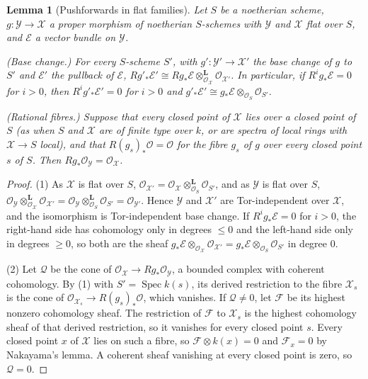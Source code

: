 \documentclass[11pt]{amsart}
\numberwithin{table}{section}
\numberwithin{figure}{section}
\numberwithin{equation}{section}
\newtheorem{lem}[thm]{Lemma}
\theoremstyle{definition}
\theoremstyle{plain}
\newcommand{\cO}{\mathcal{O}}
\newcommand{\cX}{\mathcal{X}}
\newcommand{\cY}{\mathcal{Y}}
\DeclareMathOperator{\Spec}{Spec}
\begin{document}
\begin{lem}[Pushforwards in flat families]\label{lem:flatfamilies}
Let $S$ be a noetherian scheme, $g\colon \cY \to \cX$ a proper morphism of noetherian $S$-schemes with $\cY$ and $\cX$ flat over $S$, and $\mathcal E$ a vector bundle on $\cY$.
\begin{thmlist}
\item (Base change.) For every $S$-scheme $S'$, with $g'\colon \cY' \to \cX'$ the base change of $g$ to $S'$ and $\mathcal E'$ the pullback of $\mathcal E$, $Rg'_*\mathcal E' \cong Rg_*\mathcal E \otimes^{\mathbf L}_{\cO_{\cX}} \cO_{\cX'}$. In particular, if $R^ig_*\mathcal E = 0$ for $i > 0$, then $R^ig'_*\mathcal E' = 0$ for $i > 0$ and $g'_*\mathcal E' \cong g_*\mathcal E \otimes_{\cO_S} \cO_{S'}$.
\item (Rational fibres.) Suppose that every closed point of $\cX$ lies over a closed point of $S$ (as when $S$ and $\cX$ are of finite type over $k$, or are spectra of local rings with $\cX \to S$ local), and that $R(g_s)_*\cO = \cO$ for the fibre $g_s$ of $g$ over every closed point $s$ of $S$. Then $Rg_*\cO_{\cY} = \cO_{\cX}$.
\end{thmlist}
\end{lem}

\begin{proof}
(1) As $\cX$ is flat over $S$, $\cO_{\cX'} = \cO_{\cX} \otimes^{\mathbf L}_{\cO_S} \cO_{S'}$, and as $\cY$ is flat over $S$, $\cO_{\cY} \otimes^{\mathbf L}_{\cO_{\cX}} \cO_{\cX'} = \cO_{\cY} \otimes^{\mathbf L}_{\cO_S} \cO_{S'} = \cO_{\cY'}$. Hence $\cY$ and $\cX'$ are Tor-independent over $\cX$, and the isomorphism is Tor-independent base change. If $R^ig_*\mathcal E = 0$ for $i > 0$, the right-hand side has cohomology only in degrees $\le 0$ and the left-hand side only in degrees $\ge 0$, so both are the sheaf $g_*\mathcal E \otimes_{\cO_{\cX}} \cO_{\cX'} = g_*\mathcal E \otimes_{\cO_S} \cO_{S'}$ in degree $0$.

(2) Let $\mathcal Q$ be the cone of $\cO_{\cX} \to Rg_*\cO_{\cY}$, a bounded complex with coherent cohomology. By (1) with $S' = \Spec k(s)$, its derived restriction to the fibre $\cX_s$ is the cone of $\cO_{\cX_s} \to R(g_s)_*\cO$, which vanishes. If $\mathcal Q \neq 0$, let $\mathcal F$ be its highest nonzero cohomology sheaf. The restriction of $\mathcal F$ to $\cX_s$ is the highest cohomology sheaf of that derived restriction, so it vanishes for every closed point $s$. Every closed point $x$ of $\cX$ lies on such a fibre, so $\mathcal F \otimes k(x) = 0$ and $\mathcal F_x = 0$ by Nakayama's lemma. A coherent sheaf vanishing at every closed point is zero, so $\mathcal Q = 0$.
\end{proof}
\end{document}
